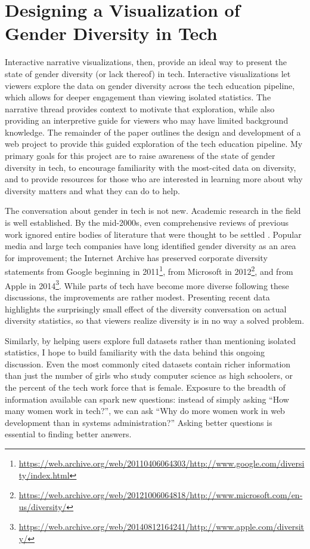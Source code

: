 \section{Designing a Visualization of Gender Diversity in Tech}\label{sec:design}
Interactive narrative visualizations, then, provide an ideal way to present the state of gender diversity (or lack thereof) in tech. Interactive visualizations let viewers explore the data on gender diversity across the tech education pipeline, which allows for deeper engagement than viewing isolated statistics. The narrative thread provides context to motivate that exploration, while also providing an interpretive guide for viewers who may have limited background knowledge. The remainder of the paper outlines the design and development of a web project to provide this guided exploration of the tech education pipeline. My primary goals for this project are to raise awareness of the state of gender diversity in tech, to encourage familiarity with the most-cited data on diversity, and to provide resources for those who are interested in learning more about why diversity matters and what they can do to help.

The conversation about gender in tech is not new. Academic research in the field is well established. By the mid-2000s, even comprehensive reviews of previous work ignored entire bodies of literature that were thought to be settled \citep{Sanders2005Gender}. Popular media and large tech companies have long identified gender diversity as an area for improvement; the Internet Archive has preserved corporate diversity statements from Google beginning in 2011\footnote{\url{https://web.archive.org/web/20110406064303/http://www.google.com/diversity/index.html}}, from Microsoft in 2012\footnote{\url{https://web.archive.org/web/20121006064818/http://www.microsoft.com/en-us/diversity/}}, and from Apple in 2014\footnote{\url{https://web.archive.org/web/20140812164241/http://www.apple.com/diversity/}}. While parts of tech have become more diverse following these discussions, the improvements are rather modest. Presenting recent data highlights the surprisingly small effect of the diversity conversation on actual diversity statistics, so that viewers realize diversity is in no way a solved problem.

Similarly, by helping users explore full datasets rather than mentioning isolated statistics, I hope to build familiarity with the data behind this ongoing discussion. Even the most commonly cited datasets contain richer information than just the number of girls who study computer science as high schoolers, or the percent of the tech work force that is female. Exposure to the breadth of information available can spark new questions: instead of simply asking ``How many women work in tech?'', we can ask ``Why do more women work in web development than in systems administration?'' Asking better questions is essential to finding better answers.

